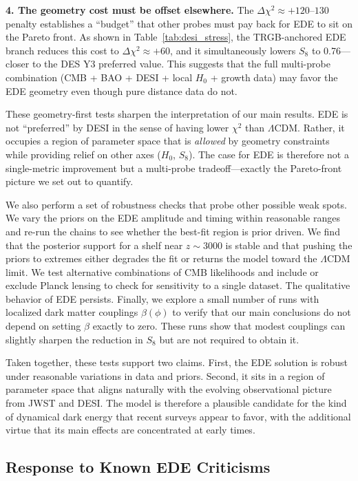 \documentclass[a4paper,11pt]{article}
\begin{document}
\textbf{4. The geometry cost must be offset elsewhere.} The $\Delta\chi^2 \approx +120$--$130$ penalty establishes a ``budget'' that other probes must pay back for EDE to sit on the Pareto front. As shown in Table~\ref{tab:desi_stress}, the TRGB-anchored EDE branch reduces this cost to $\Delta\chi^2 \approx +60$, and it simultaneously lowers $S_8$ to 0.76---closer to the DES Y3 preferred value. This suggests that the full multi-probe combination (CMB + BAO + DESI + local $H_0$ + growth data) may favor the EDE geometry even though pure distance data do not.

These geometry-first tests sharpen the interpretation of our main results. EDE is not ``preferred'' by DESI in the sense of having lower $\chi^2$ than $\Lambda$CDM. Rather, it occupies a region of parameter space that is \emph{allowed} by geometry constraints while providing relief on other axes ($H_0$, $S_8$). The case for EDE is therefore not a single-metric improvement but a multi-probe tradeoff---exactly the Pareto-front picture we set out to quantify.

We also perform a set of robustness checks that probe other possible weak spots. We vary the priors on the EDE amplitude and timing within reasonable ranges and re-run the chains to see whether the best-fit region is prior driven. We find that the posterior support for a shelf near $z \sim 3000$ is stable and that pushing the priors to extremes either degrades the fit or returns the model toward the $\Lambda$CDM limit. We test alternative combinations of CMB likelihoods and include or exclude Planck lensing to check for sensitivity to a single dataset. The qualitative behavior of EDE persists. Finally, we explore a small number of runs with localized dark matter couplings $\beta(\phi)$ to verify that our main conclusions do not depend on setting $\beta$ exactly to zero. These runs show that modest couplings can slightly sharpen the reduction in $S_8$ but are not required to obtain it.

Taken together, these tests support two claims. First, the EDE solution is robust under reasonable variations in data and priors. Second, it sits in a region of parameter space that aligns naturally with the evolving observational picture from JWST and DESI. The model is therefore a plausible candidate for the kind of dynamical dark energy that recent surveys appear to favor, with the additional virtue that its main effects are concentrated at early times.

\subsection{Response to Known EDE Criticisms}
\label{sec:criticisms}
\end{document}
